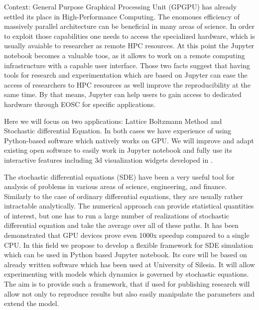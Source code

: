 \begin{task}[
  title=Application: Reproducible research based on GPU,
  id=application-gpu,
  lead=SIL,
  PM=12,
  wphases={4-36},
  partners={}
]


Context: General Purpose Graphical Processing Unit (GPGPU) has already settled its place in High-Performance Computing. The enomoues efficiency of massively parallel architecture can be beneficial in many areas of science. In order to exploit those capabilities one needs to access the specialized hardware, which is usually avaiable to researcher as remote HPC resources. At this point the Jupyter notebook becomes a valuable toos, as it allows to work on a remote computing infrastructure with a capable user interface. Those two facts suggest that having tools for research and experimentation which are based on Jupyter can ease the access of researchers to HPC resources as well improve the reproducibility at the same time. By that means, Jupyter can help users to gain access to dedicated hardware through EOSC for specific applications.

Here we will focus on two applications: Lattice Boltzmann Method and Stochastic differential Equation. In both cases we have experience of using Python-based software which natively works on GPU. We will improve and adapt existing open software to easily work in Jupyter notebook and fully use its interactive features including 3d visualization widgets developed in .

The stochastic differential equations (SDE) have been a very useful tool for analysis of problems in various areas of science, engineering, and finance. Similarly to the case of ordinary differential equations, they are usually rather intractable analytically. The numerical approach can provide  statistical quantities of interest, but one has to run a large number of realizations of stochastic differential equation and take the average over all of these paths. It has been demonstrated that GPU devices prove even 1000x speedup compared to a single CPU\cite{januszewski2010accelerating,spiechowicz2015gpu}. In this field we propose to develop a flexible framework for SDE simulation which can be used in Python based Jupyter notebook. Its core will be based on already written software which has been used at University of Silesia.  It will allow experimenting with models which dynamics is governed by stochastic equations. The aim is to provide such a framework, that if used for publishing research will allow not only to reproduce results but also easily manipulate the parameters and extend the model.


\end{task}
